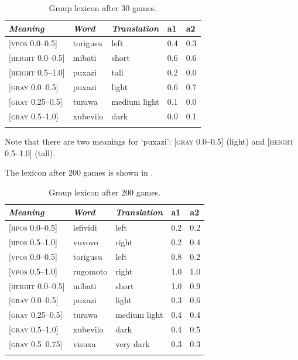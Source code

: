 \begin{table}[b]
\begin{center}
\begin{tabular}{ l  l  l  l  l }
\lsptoprule
{\itshape Meaning}&{\itshape Word}&{\itshape Translation} & {\bfshape  a1}&{\bfshape  a2} \\ \midrule
{}[\textsc{vpos} 0.0–0.5] &torigusu&left&0.4&0.3\\ 
{}[\textsc{height} 0.0–0.5]&mibati&short &0.6&0.6\\ 
{}[\textsc{height} 0.5–1.0]&puxazi&tall &0.2&0.0\\ 
{}[\textsc{gray} 0.0–0.5]& puxazi&light &0.6&0.7\\ 
{}[\textsc{gray} 0.25–0.5]&turawa&medium light&0.1&0.0\\ 
{}[\textsc{gray} 0.5–1.0]& xubevilo&dark &0.0&0.1\\ 
\lspbottomrule
\end{tabular}
\caption{\label{tab:after30}Group lexicon after 30 games.}
\end{center}
\end{table}

Note that there are two meanings for `puxazi': \enlargethispage{1\baselineskip}
{}[\textsc{gray} 0.0–0.5] (light) and [\textsc{height} 0.5–1.0] (tall). 

The lexicon after 200 games is shown in . 


\begin{table} 
\begin{center}
\begin{tabular}{ l  l  l  l  l }
\lsptoprule
{\itshape Meaning}&{\itshape Word}&{\itshape Translation} & {\bfshape  a1}&{\bfshape  a2} \\ \midrule
{}[\textsc{hpos} 0.0–0.5] &lefividi&left&0.2&0.2\\ 
{}[\textsc{hpos} 0.5–1.0] &vuvovo&right&0.2&0.4\\ 
{}[\textsc{vpos} 0.0–0.5] &torigusu&left&0.8&0.2\\ 
{}[\textsc{vpos} 0.5–1.0] &rugomoto&right&1.0&1.0\\ 
{}[\textsc{height} 0.0–0.5]&mibati&short &1.0&0.9\\ 
{}[\textsc{gray} 0.0–0.5]& puxazi&light &0.3&0.6\\ 
{}[\textsc{gray} 0.25–0.5]&turawa&medium light&0.4&0.4\\ 
{}[\textsc{gray} 0.5–1.0]& xubevilo&dark &0.4&0.5\\ 
{}[\textsc{gray} 0.5–0.75]& visuxa&very dark &0.3&0.3\\ 
\lspbottomrule
\end{tabular}
\caption{\label{tab:after200}Group lexicon after 200 games.}
\end{center}
\end{table}

